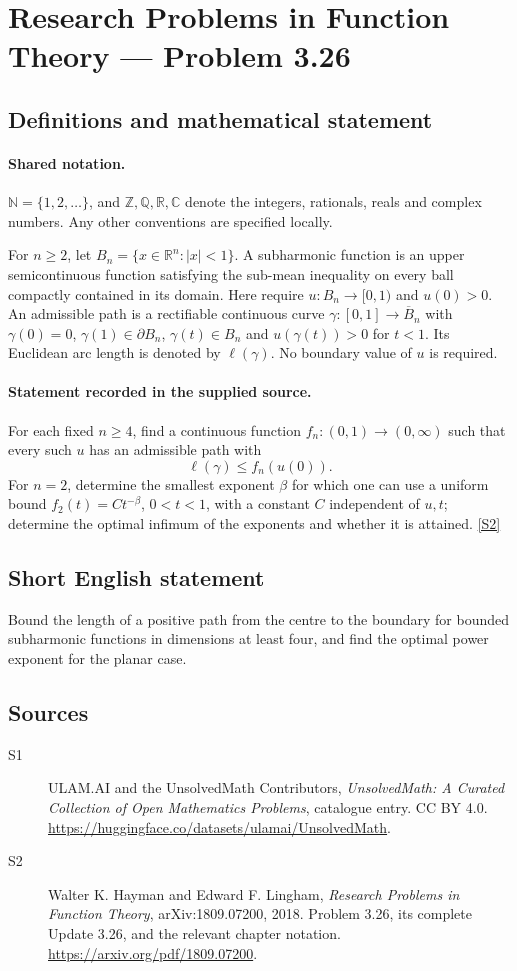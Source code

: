 \documentclass[11pt]{book}
\newcommand{\sref}[2]{\hyperlink{source:#1:#2}{[S#2]}}
\begin{document}
\section{Research Problems in Function Theory — Problem 3.26}\label{statement}

\subsection{Definitions and mathematical statement}

\paragraph{Shared notation.}$\mathbb N=\{1,2,\ldots\}$, and $\mathbb Z,\mathbb Q,\mathbb R,\mathbb C$ denote the integers, rationals, reals and complex numbers. Any other conventions are specified locally.


For $n\ge2$, let $B_n=\{x\in\mathbb R^n:|x|<1\}$. A subharmonic function is an upper semicontinuous function satisfying the sub-mean inequality on every ball compactly contained in its domain. Here require $u:B_n\to[0,1)$ and $u(0)>0$. An admissible path is a rectifiable continuous curve $\gamma:[0,1]\to\overline B_n$ with $\gamma(0)=0$, $\gamma(1)\in\partial B_n$, $\gamma(t)\in B_n$ and $u(\gamma(t))>0$ for $t<1$. Its Euclidean arc length is denoted by $\ell(\gamma)$. No boundary value of $u$ is required.
\paragraph{Statement recorded in the supplied source.}
For each fixed $n\ge4$, find a continuous function $f_n:(0,1)\to(0,\infty)$ such that every such $u$ has an admissible path with
\[\ell(\gamma)\le f_n(u(0)).\]
For $n=2$, determine the smallest exponent $\beta$ for which one can use a uniform bound $f_2(t)=Ct^{-\beta}$, $0<t<1$, with a constant $C$ independent of $u,t$; determine the optimal infimum of the exponents and whether it is attained. \sref{statement}{2}
\subsection{Short English statement}
Bound the length of a positive path from the centre to the boundary for bounded subharmonic functions in dimensions at least four, and find the optimal power exponent for the planar case.
\subsection{Sources}
\begin{description}
\item[\hypertarget{source:statement:1}{S1}] ULAM.AI and the UnsolvedMath Contributors, \emph{UnsolvedMath: A Curated Collection of Open Mathematics Problems}, catalogue entry. CC BY 4.0. \url{https://huggingface.co/datasets/ulamai/UnsolvedMath}.
\item[\hypertarget{source:statement:2}{S2}] Walter K. Hayman and Edward F. Lingham, \emph{Research Problems in Function Theory}, arXiv:1809.07200, 2018. Problem 3.26, its complete Update 3.26, and the relevant chapter notation. \url{https://arxiv.org/pdf/1809.07200}.
\end{description}
\label{end:statement}
\end{document}
